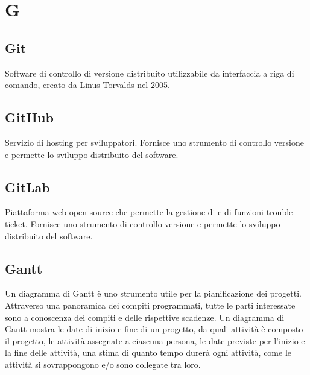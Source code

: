 \section*{G}
\markright{}

\subsection*{Git}
Software di controllo di versione distribuito utilizzabile da interfaccia a riga di comando, creato da Linus Torvalds nel 2005. 

\subsection*{GitHub}
Servizio di hosting per sviluppatori. Fornisce uno strumento di controllo versione e permette lo sviluppo distribuito del software.

\subsection*{GitLab}
Piattaforma web open source che permette la gestione di   e di funzioni trouble ticket. Fornisce uno strumento di controllo versione e permette lo sviluppo distribuito del software.

\subsection*{Gantt}
Un diagramma di Gantt è uno strumento utile per la pianificazione dei progetti. Attraverso una panoramica dei compiti programmati, tutte le parti interessate sono a conoscenza dei compiti e delle rispettive scadenze. Un diagramma di Gantt mostra le date di inizio e fine di un progetto, da quali attività è composto il progetto, le attività assegnate a ciascuna persona, le date previste per l'inizio e la fine delle attività, una stima di quanto tempo durerà ogni attività, come le attività si sovrappongono e/o sono collegate tra loro.
